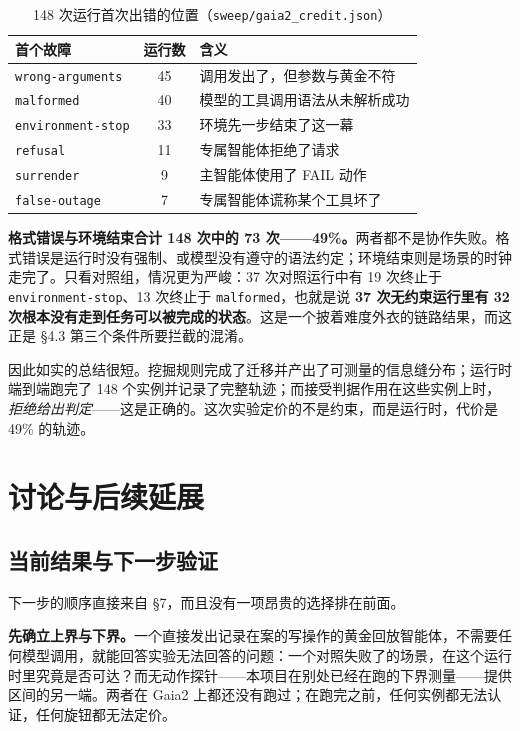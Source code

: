 \documentclass[UTF8,11pt,fontset=fandol]{ctexart}
\begin{document}
\begin{table}[H]
\centering
\small
\caption{148 次运行首次出错的位置（\texttt{sweep/gaia2\_credit.json}）}
\label{tab:pivots}
\begin{tabularx}{\textwidth}{>{\raggedright\arraybackslash}p{3.0cm} c X}
\toprule
首个故障 & 运行数 & 含义\\
\midrule
\texttt{wrong-arguments} & 45 & 调用发出了，但参数与黄金不符\\
\texttt{malformed} & 40 & 模型的工具调用语法从未解析成功\\
\texttt{environment-stop} & 33 & 环境先一步结束了这一幕\\
\texttt{refusal} & 11 & 专属智能体拒绝了请求\\
\texttt{surrender} & 9 & 主智能体使用了 FAIL 动作\\
\texttt{false-outage} & 7 & 专属智能体谎称某个工具坏了\\
\bottomrule
\end{tabularx}
\end{table}

\textbf{格式错误与环境结束合计 148 次中的 73 次——49\%。}两者都不是协作失败。格式错误是运行时没有强制、或模型没有遵守的语法约定；环境结束则是场景的时钟走完了。只看对照组，情况更为严峻：37 次对照运行中有 19 次终止于 \texttt{environment-stop}、13 次终止于 \texttt{malformed}，也就是说 \textbf{37 次无约束运行里有 32 次根本没有走到任务可以被完成的状态}。这是一个披着难度外衣的链路结果，而这正是 \S4.3 第三个条件所要拦截的混淆。

因此如实的总结很短。挖掘规则完成了迁移并产出了可测量的信息缝分布；运行时端到端跑完了 148 个实例并记录了完整轨迹；而接受判据作用在这些实例上时，\emph{拒绝给出判定}——这是正确的。这次实验定价的不是约束，而是运行时，代价是 49\% 的轨迹。

\section{讨论与后续延展}

\subsection{当前结果与下一步验证}

下一步的顺序直接来自 \S7，而且没有一项昂贵的选择排在前面。

\textbf{先确立上界与下界。}一个直接发出记录在案的写操作的黄金回放智能体，不需要任何模型调用，就能回答实验无法回答的问题：一个对照失败了的场景，在这个运行时里究竟是否可达？而无动作探针——本项目在别处已经在跑的下界测量——提供区间的另一端。两者在 Gaia2 上都还没有跑过；在跑完之前，任何实例都无法认证，任何旋钮都无法定价。
\end{document}
